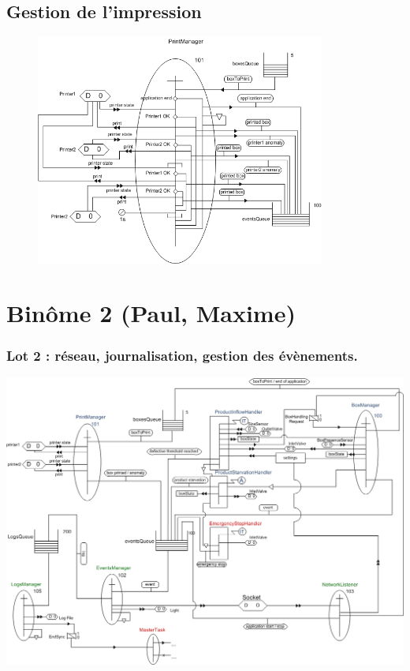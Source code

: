 \documentclass{beamer}
\begin{document}
    \subsection{Gestion de l'impression}
	\begin{frame}
	    \begin{figure}
		    \centering
		    \includegraphics[width=0.85\textwidth]{../../SchemasLCG/PrintManager.png}
	    \end{figure}
	\end{frame}

    \section{Binôme 2 (Paul, Maxime)}
	\begin{frame}
		\begin{center}
			\frametitle{Lot 2 : réseau, journalisation, gestion des évènements.}
			\includegraphics[height=0.8\textheight]{../../SchemasLCG/schemaGlobal.png}
		\end{center}
	\end{frame}
\end{document}
